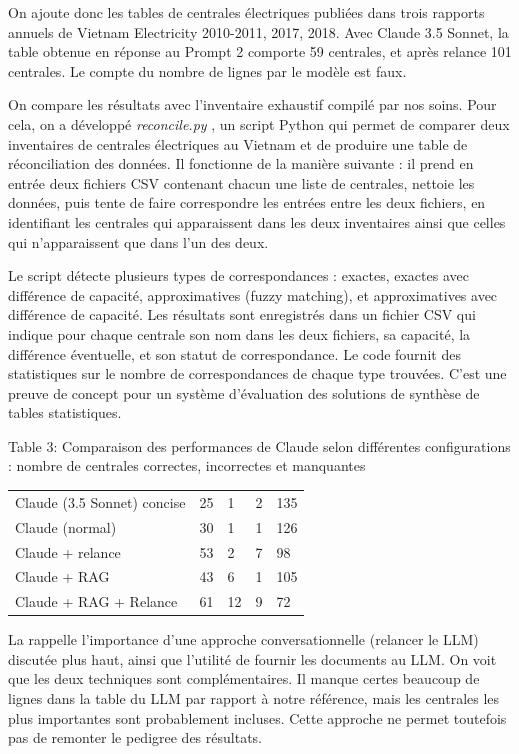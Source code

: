 \documentclass[a4paper,11pt]{report}
\begin{document}
On ajoute donc les tables de centrales électriques publiées dans trois rapports annuels de Vietnam Electricity 2010-2011, 2017, 2018. Avec Claude 3.5 Sonnet, la table obtenue en réponse au Prompt 2 comporte 59 centrales, et après relance 101 centrales. Le compte du nombre de lignes par le modèle est faux.

On compare les résultats avec l'inventaire exhaustif compilé par nos soins. Pour cela, on a développé \emph{reconcile.py} , un script Python qui permet de comparer deux inventaires de centrales électriques au Vietnam et de produire une table de réconciliation des données. Il fonctionne de la manière suivante : il prend en entrée deux fichiers CSV contenant chacun une liste de centrales, nettoie les données, puis tente de faire correspondre les entrées entre les deux fichiers, en identifiant les centrales qui apparaissent dans les deux inventaires ainsi que celles qui n'apparaissent que dans l'un des deux.

Le script détecte plusieurs types de correspondances : exactes, exactes avec différence de capacité, approximatives (fuzzy matching), et approximatives avec différence de capacité. Les résultats sont enregistrés dans un fichier CSV qui indique pour chaque centrale son nom dans les deux fichiers, sa capacité, la différence éventuelle, et son statut de correspondance. Le code fournit des statistiques sur le nombre de correspondances de chaque type trouvées. C'est une preuve de concept pour un système d'évaluation des solutions de synthèse de tables statistiques.

Table 3: Comparaison des performances de Claude selon différentes configurations : nombre de centrales correctes, incorrectes et manquantes

\begin{longtable}[]{@{}lllll@{}}
\toprule\noalign{}
& & & & \\
\midrule\noalign{}
\endhead
\bottomrule\noalign{}
\endlastfoot
Claude (3.5 Sonnet) concise & 25 & 1 & 2 & 135 \\
Claude (normal) & 30 & 1 & 1 & 126 \\
Claude + relance & 53 & 2 & 7 & 98 \\
Claude + RAG & 43 & 6 & 1 & 105 \\
Claude + RAG + Relance & 61 & 12 & 9 & 72 \\
\end{longtable}

La rappelle l'importance d'une approche conversationnelle (relancer le LLM) discutée plus haut, ainsi que l'utilité de fournir les documents au LLM. On voit que les deux techniques sont complémentaires. Il manque certes beaucoup de lignes dans la table du LLM par rapport à notre référence, mais les centrales les plus importantes sont probablement incluses. Cette approche ne permet toutefois pas de remonter le pedigree des résultats.
\end{document}
